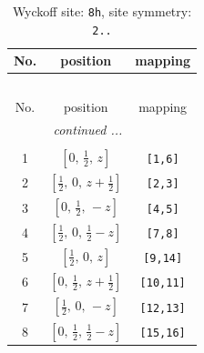 \documentclass[fleqn,8pt]{jsarticle}
\begin{document}
\begin{longtable}{ccc}
\caption{Wyckoff site: {\tt 8h}, site symmetry: {\tt 2..}}
 \\
 \hline \hline
No. & position & mapping \\ \hline \endfirsthead

\multicolumn{2}{l}{\tablename\ \thetable{}} \\
 \hline \hline
No. & position & mapping \\ \hline \endhead

 \hline \hline
\multicolumn{2}{r}{\footnotesize\it continued ...} \\ \endfoot

 \hline \hline
\multicolumn{2}{r}{} \\ \endlastfoot

1 & $\left[ 0,\, \frac{1}{2},\, z \right]$ & {\tt [1,6]} \\ \hline
2 & $\left[ \frac{1}{2},\, 0,\, z + \frac{1}{2} \right]$ & {\tt [2,3]} \\ \hline
3 & $\left[ 0,\, \frac{1}{2},\, - z \right]$ & {\tt [4,5]} \\ \hline
4 & $\left[ \frac{1}{2},\, 0,\, \frac{1}{2} - z \right]$ & {\tt [7,8]} \\ \hline
5 & $\left[ \frac{1}{2},\, 0,\, z \right]$ & {\tt [9,14]} \\ \hline
6 & $\left[ 0,\, \frac{1}{2},\, z + \frac{1}{2} \right]$ & {\tt [10,11]} \\ \hline
7 & $\left[ \frac{1}{2},\, 0,\, - z \right]$ & {\tt [12,13]} \\ \hline
8 & $\left[ 0,\, \frac{1}{2},\, \frac{1}{2} - z \right]$ & {\tt [15,16]} \\
\end{longtable}
\renewcommand{\arraystretch}{1.2}
\end{document}
